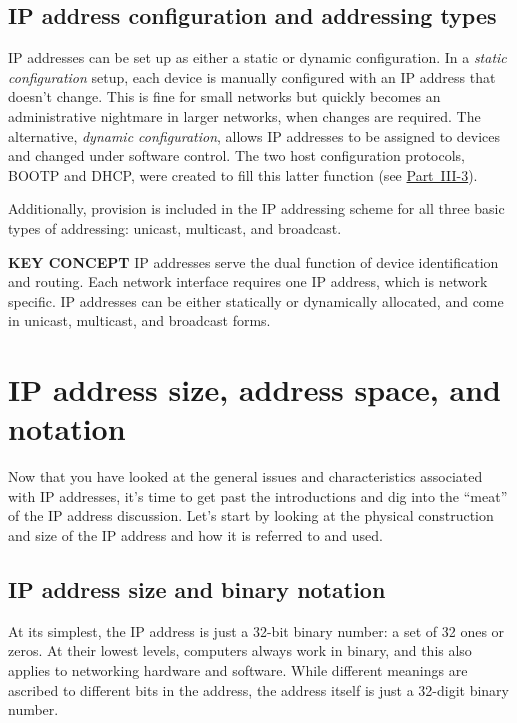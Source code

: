 \documentclass[b5paper,11pt]{memoir}
\begin{document}
\subsection{IP address configuration and addressing types}

IP addresses can be set up as either a static or dynamic configuration.
In a {\emph{static configuration}} setup, each device is manually configured with an IP address that doesn't change.
This is fine for small networks but quickly becomes an administrative nightmare in larger networks, when changes are required.
The alternative, {\emph{dynamic configuration}}, allows \protect\hypertarget{ch16.htmlux5cux23idx-CHP-16-0652}{}{}IP addresses to be assigned to devices and changed under software control.
The two host configuration protocols, BOOTP and DHCP, were created to fill this latter function (see \protect\hyperlink{pt14.html}{Part~III-3}).

Additionally, provision is included in the IP addressing scheme for all three basic types of addressing: unicast, multicast, and broadcast.

{\textbf{KEY CONCEPT}} IP addresses serve the dual function of device identification and routing. Each network interface requires one IP address, which is network specific. IP addresses can be either statically or dynamically allocated, and come in unicast, multicast, and broadcast forms.



\section{IP address size, address space, and notation}

Now that you have looked at the general issues and characteristics
associated with IP addresses, it's time to get past the introductions
and dig into the ``meat'' of the IP address discussion.
Let's start by looking at the physical construction and size of the IP address and how it is referred to and used.


\subsection{IP address size and binary notation}

At its simplest, the IP address is just a 32-bit binary number: a set of 32 ones or zeros. At their lowest levels, computers always work in binary,
and this also applies to networking hardware and software. While
different meanings are ascribed to different bits in the address, the
address itself is just a 32-digit binary number.
\end{document}

